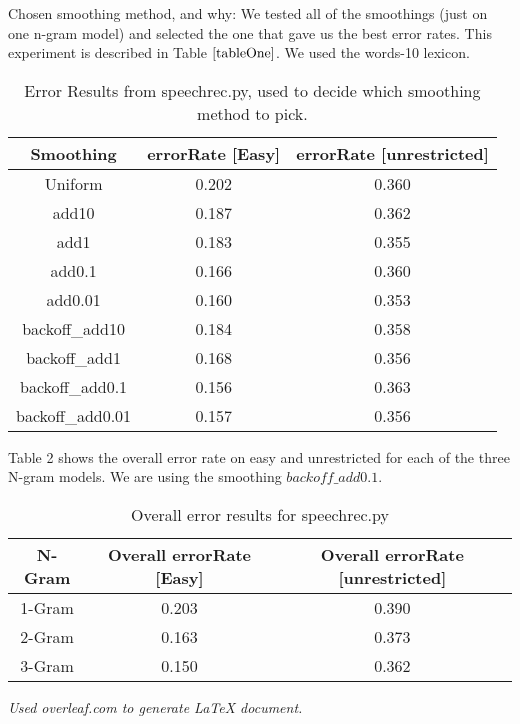 \documentclass[12pt, letterpaper]{article}
\begin{document}
Chosen smoothing method, and why: We tested all of the smoothings (just on one n-gram model) and selected the one that gave us the best error rates. This experiment is described in Table $\ref{tableOne}$. We used the words-10 lexicon.

\begin{table}
\begin{center}
\begin{tabular}{|c|c|c|}
\hline
Smoothing & errorRate [Easy] & errorRate [unrestricted]\\
\hline \hline
Uniform & 0.202 & 0.360\\
\hline 
add10 & 0.187 & 0.362\\
\hline 
add1 & 0.183 & 0.355\\
\hline 
add0.1 & 0.166 & 0.360\\
\hline 
add0.01 & 0.160 & 0.353\\
\hline 
backoff\_add10 & 0.184 & 0.358\\
\hline 
backoff\_add1 & 0.168 & 0.356\\
\hline 
backoff\_add0.1 & 0.156 & 0.363\\
\hline 
backoff\_add0.01 & 0.157 & 0.356\\
\hline
\end{tabular}
\end{center}
\caption{Error Results from speechrec.py, used to decide which smoothing method to pick.}
\label{tableOne}
\end{table}

Table 2 shows the overall error rate on easy and unrestricted for each of the three N-gram models. We are using the smoothing $backoff\_add0.1$. 

\begin{table}
\begin{center}
\begin{tabular}{|c|c|c|}
\hline
N-Gram & Overall errorRate [Easy] & Overall errorRate [unrestricted]\\
\hline \hline
1-Gram & 0.203 & 0.390\\
\hline
2-Gram & 0.163 & 0.373\\
\hline
3-Gram & 0.150 & 0.362\\
\hline
\end{tabular}
\end{center}
\caption{Overall error results for speechrec.py}
\label{tableTwo}
\end{table}

\begin{center}
\textit{Used overleaf.com to generate LaTeX document.}
\end{center}
\end{document}
